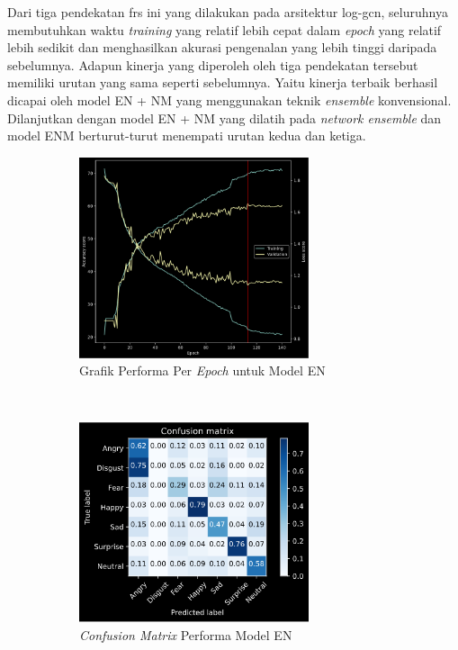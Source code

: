 Dari tiga pendekatan \acrshort{frs} ini yang dilakukan pada arsitektur log-\acrshort{gcn}, seluruhnya membutuhkan waktu \textit{training} yang relatif lebih cepat dalam \textit{epoch} yang relatif lebih sedikit dan menghasilkan akurasi pengenalan yang lebih tinggi daripada sebelumnya. Adapun kinerja yang diperoleh oleh tiga pendekatan tersebut memiliki urutan yang sama seperti sebelumnya. Yaitu kinerja terbaik berhasil dicapai oleh model EN + NM yang menggunakan teknik \textit{ensemble} konvensional. Dilanjutkan dengan model EN + NM yang dilatih pada \textit{network ensemble} dan model ENM berturut-turut menempati urutan kedua dan ketiga.

\begin{figure}[t]
    \centering
    \begin{subfigure}[t]{6.75cm}
        \includegraphics[width=6.75cm]{gambar/eksperimen5b1_grafik1.png}
        \caption{Grafik Performa Per \textit{Epoch} untuk Model EN}
        \label{fig:grafikeksperimen5b11}
    \end{subfigure}
    ~~~
    \begin{subfigure}[t]{6.75cm}
        \includegraphics[width=6.75cm]{gambar/eksperimen5b1_matriks1.png}
        \caption{\textit{Confusion Matrix} Performa Model EN}
        \label{fig:confusionmatrixeksperimen5b11}
    \end{subfigure}
    ~~~
    \begin{subfigure}[t]{6.75cm}

\end{subfigure}
\end{figure}
